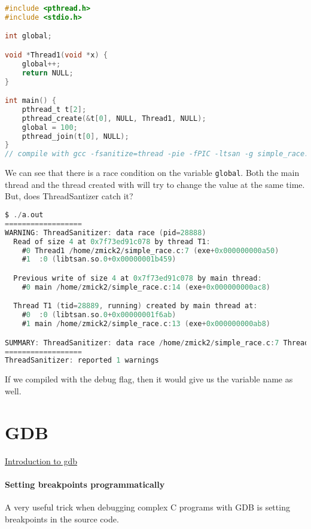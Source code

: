 \begin{lstlisting}[language=C]
#include <pthread.h>
#include <stdio.h>

int global;

void *Thread1(void *x) {
    global++;
    return NULL;
}

int main() {
    pthread_t t[2];
    pthread_create(&t[0], NULL, Thread1, NULL);
    global = 100;
    pthread_join(t[0], NULL);
}
// compile with gcc -fsanitize=thread -pie -fPIC -ltsan -g simple_race.c
\end{lstlisting}

We can see that there is a race condition on the variable \texttt{global}. Both the main thread and the thread created with  will try to change the value at the same time. But, does ThreadSantizer catch it?

\begin{lstlisting}[language=C]
$ ./a.out
==================
WARNING: ThreadSanitizer: data race (pid=28888)
  Read of size 4 at 0x7f73ed91c078 by thread T1:
    #0 Thread1 /home/zmick2/simple_race.c:7 (exe+0x000000000a50)
    #1  :0 (libtsan.so.0+0x00000001b459)

  Previous write of size 4 at 0x7f73ed91c078 by main thread:
    #0 main /home/zmick2/simple_race.c:14 (exe+0x000000000ac8)

  Thread T1 (tid=28889, running) created by main thread at:
    #0  :0 (libtsan.so.0+0x00000001f6ab)
    #1 main /home/zmick2/simple_race.c:13 (exe+0x000000000ab8)

SUMMARY: ThreadSanitizer: data race /home/zmick2/simple_race.c:7 Thread1
==================
ThreadSanitizer: reported 1 warnings
\end{lstlisting}

If we compiled with the debug flag, then it would give us the variable name as well.

\section{GDB}\label{gdb}

\href{http://www.cs.cmu.edu/~gilpin/tutorial/}{Introduction to gdb}

\paragraph{Setting breakpoints programmatically}

A very useful trick when debugging complex C programs with GDB is setting breakpoints in the source code.

